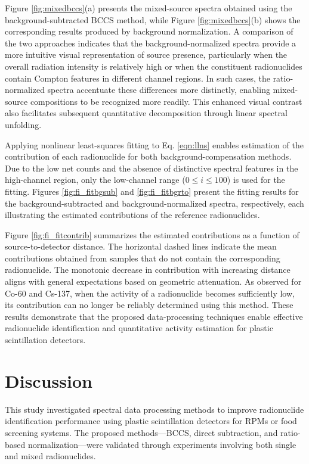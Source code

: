 \documentclass[10pt]{wlscirep}
\begin{document}
Figure \ref{fig:mixedbccs}(a) presents the mixed-source spectra obtained using the background-subtracted BCCS method, while Figure \ref{fig:mixedbccs}(b) shows the corresponding results produced by background normalization. A comparison of the two approaches indicates that the background-normalized spectra provide a more intuitive visual representation of source presence, particularly when the overall radiation intensity is relatively high or when the constituent radionuclides contain Compton features in different channel regions. In such cases, the ratio-normalized spectra accentuate these differences more distinctly, enabling mixed-source compositions to be recognized more readily. This enhanced visual contrast also facilitates subsequent quantitative decomposition through linear spectral unfolding.

Applying nonlinear least-squares fitting to Eq. \ref{eqn:llns} enables estimation of the contribution of each radionuclide for both background-compensation methods. Due to the low net counts and the absence of distinctive spectral features in the high-channel region, only the low-channel range ($0 \le i \le 100$) is used for the fitting. Figures \ref{fig:fi_fitbgsub} and \ref{fig:fi_fitbgrto} present the fitting results for the background-subtracted and background-normalized spectra, respectively, each illustrating the estimated contributions of the reference radionuclides.

Figure \ref{fig:fi_fitcontrib} summarizes the estimated contributions as a function of source-to-detector distance. The horizontal dashed lines indicate the mean contributions obtained from samples that do not contain the corresponding radionuclide. The monotonic decrease in contribution with increasing distance aligns with general expectations based on geometric attenuation. As observed for Co-60 and Cs-137, when the activity of a radionuclide becomes sufficiently low, its contribution can no longer be reliably determined using this method. These results demonstrate that the proposed data-processing techniques enable effective radionuclide identification and quantitative activity estimation for plastic scintillation detectors.

\section*{Discussion}

This study investigated spectral data processing methods to improve radionuclide identification performance using plastic scintillation detectors for RPMs or food screening systems. The proposed methods—BCCS, direct subtraction, and ratio-based normalization—were validated through experiments involving both single and mixed radionuclides.
\end{document}
